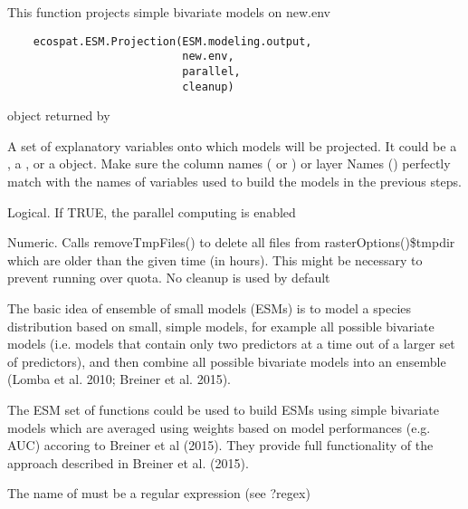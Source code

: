 \documentclass[a4paper]{book}
\begin{document}
%
\begin{Description}\relax
This function projects simple bivariate models on new.env
\end{Description}
%
\begin{Usage}
\begin{verbatim}
    ecospat.ESM.Projection(ESM.modeling.output, 
                           new.env, 
                           parallel,
                           cleanup)
\end{verbatim}
\end{Usage}
%
\begin{Arguments}
\begin{ldescription}
\item[\code{ESM.modeling.output}] 
 object returned by 

\item[\code{new.env}] 
A set of explanatory variables onto which models will be projected. It could be a , a , or a  object. Make sure the column names ( or ) or layer Names () perfectly match with the names of variables used to build the models in the previous steps.

\item[\code{parallel}] 
Logical. If TRUE, the parallel computing is enabled
\item[\code{cleanup}] 
Numeric. Calls removeTmpFiles() to delete all files from rasterOptions()\$tmpdir which are older than the given time (in hours). This might be necessary to prevent running over quota. No cleanup is used by default

\end{ldescription}
\end{Arguments}
%
\begin{Details}\relax
The basic idea of ensemble of small models (ESMs) is to model a species distribution based on small, simple models, for example all possible bivariate models (i.e. models that contain only two predictors at a time out of a larger set of predictors), and then combine all possible bivariate models into an ensemble (Lomba et al. 2010; Breiner et al. 2015).

The ESM set of functions could be used to build ESMs using simple bivariate models which are averaged using weights based on model performances (e.g. AUC) accoring to Breiner et al (2015). They provide full functionality of the approach described in Breiner et al. (2015).

The name of  must be a regular expression (see ?regex)
\end{Details}
\end{document}
